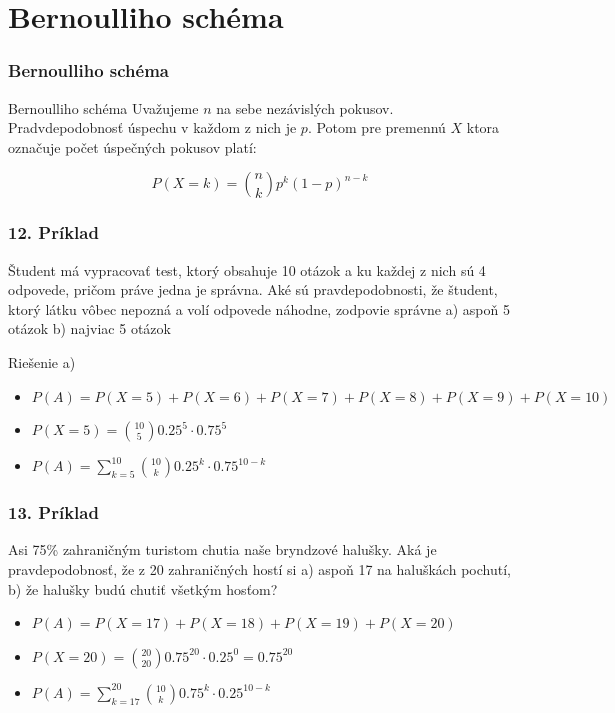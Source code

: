\documentclass{beamer}
\begin{document}
\section{Bernoulliho schéma}
\begin{frame}
\frametitle{Bernoulliho schéma}

\begin{block}{Bernoulliho schéma}
Uvažujeme $n$ na sebe nezávislých pokusov. Pradvdepodobnosť úspechu v každom z nich je $p$. Potom pre premennú $X$ ktora označuje počet úspečných pokusov platí:

\begin{equation}
P(X = k) = \binom{n}{k} p^k (1 - p)^{n-k} 
\end{equation}
\end{block}
\end{frame}

\begin{frame}
\frametitle{12. Príklad}

Študent má vypracovať test, ktorý obsahuje 10 otázok a ku každej z nich sú 4 odpovede, pričom práve jedna je správna. Aké sú pravdepodobnosti, že študent, ktorý látku vôbec nepozná a volí odpovede náhodne, zodpovie správne a) aspoň 5 otázok b) najviac 5 otázok

Riešenie a)
\begin{itemize}
\item<2-> $P(A) = P(X = 5) + P(X = 6) + P(X = 7) + P(X = 8) + P(X = 9) + P(X = 10)$
\item<3-> $P(X = 5) = \binom{10}{5} 0.25^5 \cdot 0.75^5$
\item<4-> $P(A) = \sum_{k=5}^{10} \binom{10}{k} 0.25^k \cdot 0.75^{10-k}$
\end{itemize}

\end{frame}

\begin{frame}
\frametitle{13. Príklad}

Asi 75\% zahraničným turistom chutia naše bryndzové halušky. Aká je pravdepodobnosť, že z 20 zahraničných hostí si a) aspoň 17 na haluškách pochutí, b) že halušky budú chutiť všetkým hosťom?

\begin{itemize}
\item<2-> $P(A) = P(X = 17) + P(X = 18) + P(X = 19) + P(X = 20)$
\item<3-> $P(X = 20) = \binom{20}{20} 0.75^{20} \cdot 0.25^0 = 0.75^{20}$
\item<4-> $P(A) = \sum_{k=17}^{20} \binom{10}{k} 0.75^k \cdot 0.25^{10-k}$
\end{itemize}
\end{frame}
\end{document}
